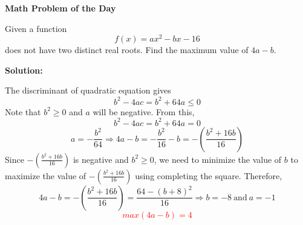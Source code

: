\documentclass[12pt]{article}
\begin{document}
	\centering
		\large{\textbf{Math Problem of the Day}}
	\justify
	
	Given a function
	\[f(x) = ax^2-bx-16\] 
	does not have two distinct real roots. Find the maximum value of $4a-b$.
	
	\bigskip
	\noindent
		\textbf{Solution:}
	
	\noindent
		The discriminant of quadratic equation gives 
		\[  b^2-4ac = b^2+64a \leq 0\]
		Note that $b^2 \geq 0$ and $a$ will be negative. From this,
		\[  b^2-4ac = b^2+64a = 0 \]
		\[ a = -\frac{b^2}{64} \Rightarrow 4a-b= -\frac{b^2}{16} - b = - \left( \frac{b^2+16b}{16} \right) \]
		Since $- \left( \frac{b^2+16b}{16} \right)$ is negative and $b^2 \geq 0$, we need to minimize the value of $b$ to maximize the value of $- \left( \frac{b^2+16b}{16} \right)$ using completing the square. Therefore,
		\[ 4a-b= - \left( \frac{b^2+16b}{16} \right) = \frac{64 - {\left(b+8\right)^2}}{16} \Rightarrow b = -8 \  \text{and}\ a = -1 \] 
		\textbf{\textcolor{red}{\[ max(4a-b) = 4 \]}}
\end{document}
